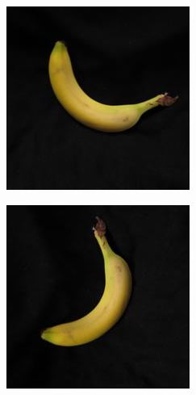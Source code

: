 \documentclass{article} %
\begin{document}
\begin{figure}[h]
  \begin{subfigure}{.123\textwidth}
  \centering
\includegraphics[width=\textwidth]{1_1.jpg}
\end{subfigure}%
 \begin{subfigure}{.123\textwidth}
  \centering
\includegraphics[width=\textwidth]{1_2.jpg}

\end{subfigure}
\end{figure}
\end{document}

